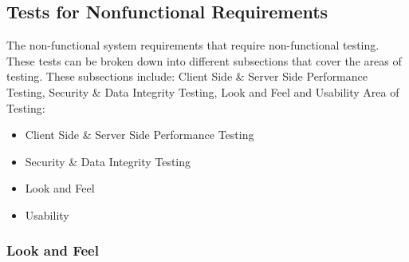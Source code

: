 \documentclass[12pt, titlepage]{article}
\begin{document}
\subsection{Tests for Nonfunctional Requirements}



The non-functional system requirements that require non-functional testing. These tests can be broken down into different subsections that cover the areas of testing. These subsections include: Client Side \& Server Side Performance Testing, Security \& Data Integrity Testing, Look and Feel and Usability
Area of Testing:
\begin{itemize}
    \item Client Side \& Server Side Performance Testing
    \item Security \& Data Integrity Testing
    \item Look and Feel 
    \item Usability
\end{itemize}


\subsubsection{Look and Feel}
\end{document}
